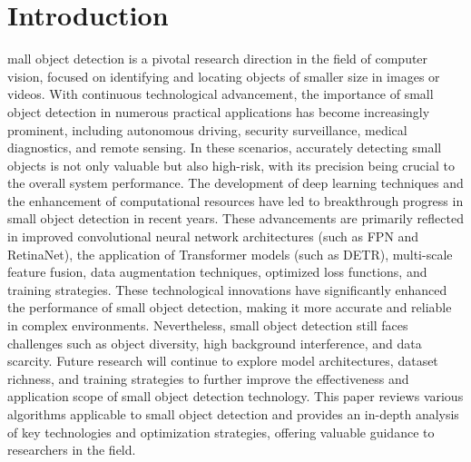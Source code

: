 \documentclass[journal]{IEEEtran}
\begin{document}
\section{Introduction}
% 
% 
% 
% 
mall object detection is a pivotal research direction in the field of computer vision, focused on identifying and locating objects of smaller size in images or videos. With continuous technological advancement, the importance of small object detection in numerous practical applications has become increasingly prominent, including autonomous driving, security surveillance, medical diagnostics, and remote sensing. In these scenarios, accurately detecting small objects is not only valuable but also high-risk, with its precision being crucial to the overall system performance.
The development of deep learning techniques and the enhancement of computational resources have led to breakthrough progress in small object detection in recent years. These advancements are primarily reflected in improved convolutional neural network architectures (such as FPN \cite{lin2017feature} and RetinaNet\cite{lin2017focal}), the application of Transformer models (such as DETR\cite{carion2020end}), multi-scale feature fusion, data augmentation techniques, optimized loss functions, and training strategies. These technological innovations have significantly enhanced the performance of small object detection, making it more accurate and reliable in complex environments.
Nevertheless, small object detection still faces challenges such as object diversity, high background interference, and data scarcity. Future research will continue to explore model architectures, dataset richness, and training strategies to further improve the effectiveness and application scope of small object detection technology. This paper reviews various algorithms applicable to small object detection and provides an in-depth analysis of key technologies and optimization strategies, offering valuable guidance to researchers in the field.
\end{document}
